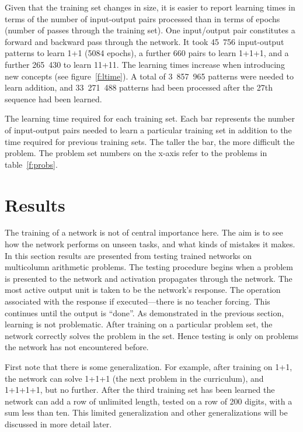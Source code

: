 Given that the
training set changes in size, it is easier to report learning
times in terms of the number of input-output pairs processed than in
terms of epochs (number of passes through the training set).
One input/output
pair constitutes a
forward and
backward pass through the network.  It took 45~756 input-output patterns
to learn 1+1 (5084 epochs), a further 660 pairs to learn 1+1+1, and a
further 265~430 to learn 11+11.  The learning times increase when
introducing new concepts (see figure~\ref{f:ltime}). A total of 3~857~965
patterns were needed to learn addition, and 33~271~488 patterns had been
processed after the 27th sequence had been learned.

\begin{fancyfigure}
\centerline{}
\caption{The learning time required for each training set. Each bar
represents the number of input-output pairs needed to learn a particular
training set in addition to the time required for previous training sets.
The taller the bar, the more difficult the problem. The problem set numbers
on the x-axis refer
to the problems in table~\protect\ref{f:probs}.}\label{f:ltime}
\end{fancyfigure}



\section{Results}\label{s:multres}

The training of a network is not of central importance here.  The aim is to
see how the network performs on unseen tasks, and what kinds of mistakes it
makes.  In this section results are presented from testing trained networks
on multicolumn arithmetic problems.  The testing procedure begins when a
problem is presented to the network and activation propagates through the
network.  The most active output unit is taken to be the network's
response. The operation associated with the response if executed---there is
no teacher forcing.  This continues until the output is ``done''.  As
demonstrated in the previous section, learning is not problematic.  After
training on a particular problem set, the network correctly solves the
problem in the set.  Hence testing is only on problems the network has not
encountered before.

First note that there is some generalization.  For example, after training
on 1+1, the network can solve 1+1+1 (the next problem in the curriculum),
and 1+1+1+1, but no further.  After the third training set has been learned
the network can add a row of unlimited length, tested on a row of 200
digits, with a sum less than ten. This limited generalization and other
generalizations will be discussed in more detail later.


